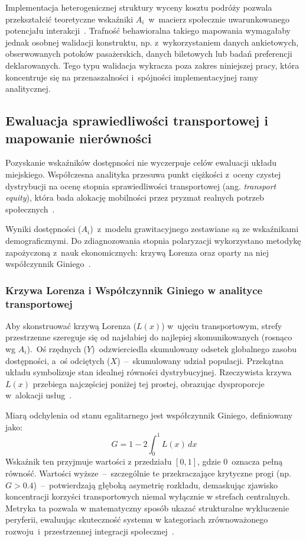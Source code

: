 \documentclass{pracamgr}
\begin{document}
Implementacja heterogenicznej struktury wyceny kosztu podróży pozwala przekształcić teoretyczne wskaźniki $A_i$~w~macierz społecznie uwarunkowanego potencjału interakcji~\cite{capetown, framework}. Trafność behawioralna takiego mapowania wymagałaby jednak osobnej walidacji konstruktu, np. z~wykorzystaniem danych ankietowych, obserwowanych potoków pasażerskich, danych biletowych lub badań preferencji deklarowanych. Tego typu walidacja wykracza poza zakres niniejszej pracy, która koncentruje się na przenaszalności i~spójności implementacyjnej ramy analitycznej.

\subsection{Ewaluacja sprawiedliwości transportowej i mapowanie nierówności}

Pozyskanie wskaźników dostępności nie wyczerpuje celów ewaluacji układu miejskiego. Współczesna analityka przesuwa punkt ciężkości z~oceny czystej dystrybucji na ocenę stopnia sprawiedliwości transportowej (ang. \textit{transport equity}), która bada alokację mobilności przez pryzmat realnych potrzeb społecznych~\cite{elavating, turon_sierpinski_2019, robustness, capetown, literature_review}.

Wyniki dostępności ($A_i$)~z~modelu grawitacyjnego zestawiane są ze wskaźnikami demograficznymi. Do zdiagnozowania stopnia polaryzacji wykorzystano metodykę zapożyczoną z~nauk ekonomicznych: krzywą Lorenza oraz oparty na niej współczynnik Giniego~\cite{tesi}.

\subsubsection{Krzywa Lorenza i Współczynnik Giniego w analityce transportowej}

Aby skonstruować krzywą Lorenza ($L(x)$) w~ujęciu transportowym, strefy przestrzenne szereguje się od najsłabiej do najlepiej skomunikowanych (rosnąco wg $A_i$).~Oś rzędnych ($Y$)~odzwierciedla skumulowany odsetek globalnego zasobu dostępności, a~oś odciętych ($X$)~–~skumulowany udział populacji. Przekątna układu symbolizuje stan idealnej równości dystrybucyjnej. Rzeczywista krzywa $L(x)$ przebiega najczęściej poniżej tej prostej, obrazując dysproporcje w~alokacji usług~\cite{tesi, lorenz}.

Miarą odchylenia od stanu egalitarnego jest współczynnik Giniego, definiowany jako:
$$G = 1 - 2 \int_{0}^{1} L(x) \, dx$$
Wskaźnik ten przyjmuje wartości z przedziału $[0, 1]$, gdzie $0$~oznacza pełną równość. Wartości wyższe~–~szczególnie te przekraczające krytyczne progi (np. $G > 0.4$)~–~potwierdzają głęboką asymetrię rozkładu, demaskując zjawisko koncentracji korzyści transportowych niemal wyłącznie w strefach centralnych. Metryka ta pozwala w matematyczny sposób ukazać strukturalne wykluczenie peryferii, ewaluując skuteczność systemu w kategoriach zrównoważonego rozwoju~i~przestrzennej integracji społecznej~\cite{tesi, lorenz}.
\end{document}
